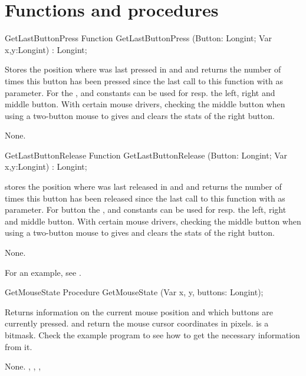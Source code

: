 \section{Functions and procedures}
\begin{function}{GetLastButtonPress}
\Declaration
Function GetLastButtonPress (Button: Longint; Var x,y:Longint) : Longint;

\Description
 
Stores the position where  was last pressed in  and
 and returns
the number of times this button has been pressed since the last call to this
function with  as parameter. For  the 
,  and  constants can be used for resp. the left, 
right and middle button.
With certain mouse drivers, checking the middle button when using a
two-button mouse to gives and clears the stats of the right button.

\Errors
None.
\SeeAlso
{}
\end{function}


\begin{function}{GetLastButtonRelease}
\Declaration
Function GetLastButtonRelease (Button: Longint; Var x,y:Longint) : Longint;

\Description

stores the position where  was last released in  and 
 and returns
the number of times this button has been released since the last call to this
function with  as parameter. For button the
,  and  constants can be used for resp. 
the left, right and middle button.
With certain mouse drivers, checking the middle button when using a
two-button mouse to gives and clears the stats of the right button.

\Errors
None.
\SeeAlso
{}
\end{function}

For an example, see .

\begin{procedure}{GetMouseState}
\Declaration
Procedure GetMouseState (Var x, y, buttons: Longint);

\Description

 Returns information on the current mouse position 
and which buttons are currently pressed.
 and  return the mouse cursor coordinates in pixels.
 is a bitmask. Check the example program to see how to get the
necessary information from it.

\Errors
None.
\SeeAlso
{}, , ,
\end{procedure}

